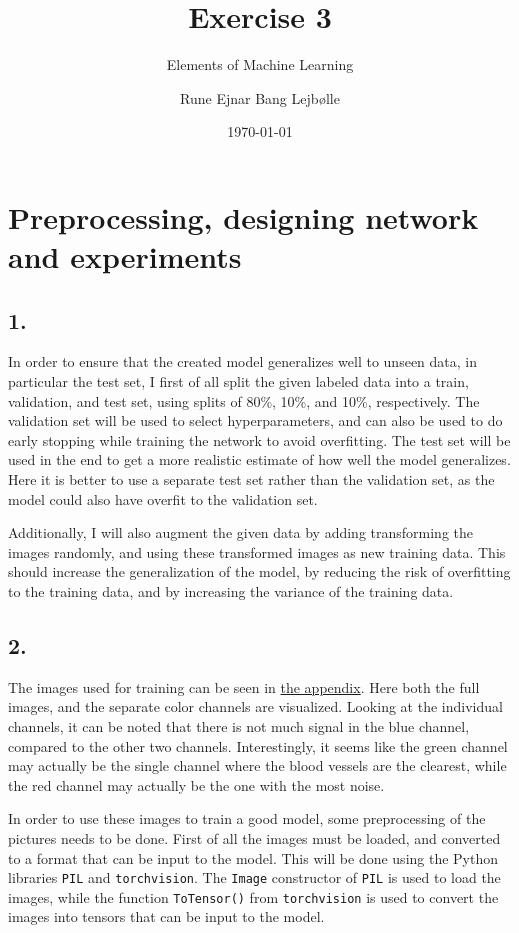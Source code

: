 \documentclass[a4paper, 12pt]{article}
\author{Rune Ejnar Bang Lejbølle}
\title{Exercise 3}
\subtitle{Elements of Machine Learning}
\date{\today}
\begin{document}
\maketitle

\section{Preprocessing, designing network and experiments}
\subsection{1.}

In order to ensure that the created model generalizes well to unseen data, in particular the test set, I first of all split the given labeled data into a train, validation, and test set, using splits of 80\%, 10\%, and 10\%, respectively. The validation set will be used to select hyperparameters, and can also be used to do early stopping while training the network to avoid overfitting. The test set will be used in the end to get a more realistic estimate of how well the model generalizes. Here it is better to use a separate test set rather than the validation set, as the model could also have overfit to the validation set.

Additionally, I will also augment the given data by adding transforming the images randomly, and using these transformed images as new training data. This should increase the generalization of the model, by reducing the risk of overfitting to the training data, and by increasing the variance of the training data.

\subsection{2.}
The images used for training can be seen in \hyperref[fig:screenshot001]{the appendix}. Here both the full images, and the separate color channels are visualized. Looking at the individual channels, it can be noted that there is not much signal in the blue channel, compared to the other two channels. Interestingly, it seems like the green channel may actually be the single channel where the blood vessels are the clearest, while the red channel may actually be the one with the most noise.

In order to use these images to train a good model, some preprocessing of the pictures needs to be done. First of all the images must be loaded, and converted to a format that can be input to the model. This will be done using the Python libraries \texttt{PIL} and \texttt{torchvision}. The \texttt{Image} constructor of \texttt{PIL} is used to load the images, while the function \texttt{ToTensor()} from \texttt{torchvision} is used to convert the images into tensors that can be input to the model.
\end{document}
